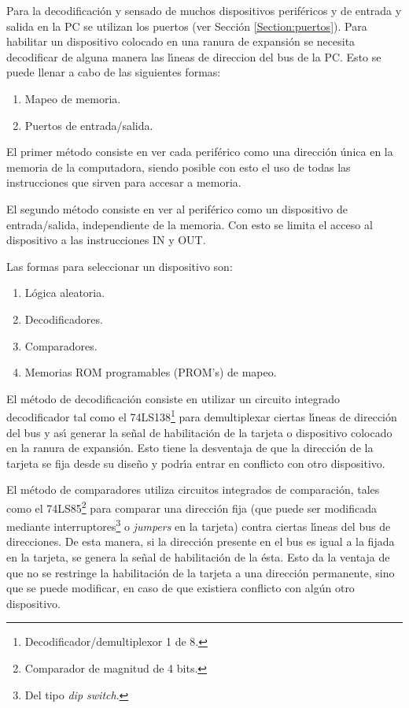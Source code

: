 Para la decodificaci\'on y sensado de muchos dispositivos perif\'ericos y de entrada y salida %
en la PC se utilizan los puertos (ver Secci\'on \ref{Section:puertos}). Para habilitar un %
dispositivo colocado en una ranura de expansi\'on se necesita decodificar de alguna manera las %
l\'{\i}neas de direccion del bus de la PC. Esto se puede llenar a cabo de las siguientes %
formas:

\begin{enumerate}
\item Mapeo de memoria.
\item Puertos de entrada/salida.
\end{enumerate}

El primer m\'etodo consiste en ver cada perif\'erico como una direcci\'on \'unica en la %
memoria de la computadora, siendo posible con esto el uso de todas las instrucciones que sirven %
para accesar a memoria.

El segundo m\'etodo consiste en ver al perif\'erico como un dispositivo de entrada/salida, %
independiente de la memoria. Con esto se limita el acceso al dispositivo a las instrucciones IN %
y OUT.

Las formas para seleccionar un dispositivo son:

\begin{enumerate}
\item L\'ogica aleatoria.
\item Decodificadores.
\item Comparadores.
\item Memorias ROM programables (PROM's) de mapeo.
\end{enumerate}

El m\'etodo de decodificaci\'on consiste en utilizar un circuito integrado decodificador tal %
como el 74LS138\footnote{Decodificador/demultiplexor 1 de 8.} para demultiplexar ciertas %
l\'{\i}neas de direcci\'on del bus y as\'{\i} generar la se\~nal de habilitaci\'on de la %
tarjeta o dispositivo colocado en la ranura de expansi\'on. Esto tiene la desventaja de que la %
direcci\'on de la tarjeta se fija desde su dise\~no y podr\'{\i}a entrar en conflicto con otro %
dispositivo.

El m\'etodo de comparadores utiliza circuitos integrados de comparaci\'on, tales como el %
74LS85\footnote{Comparador de magnitud de 4 bits.} para comparar una direcci\'on fija (que %
puede ser modificada mediante interruptores\footnote{Del tipo {\it dip switch\/}.} o {\it %
jumpers\/} en la tarjeta) contra ciertas l\'{\i}neas del bus de direcciones. De esta manera, %
si la direcci\'on presente en el bus es igual a la fijada en la tarjeta, se genera la se\~nal %
de habilitaci\'on de la \'esta. Esto da la ventaja de que no se restringe la habilitaci\'on de %
la tarjeta a una direcci\'on permanente, sino que se puede modificar, en caso de que existiera %
conflicto con alg\'un otro dispositivo.

